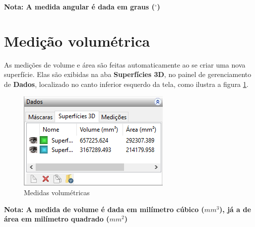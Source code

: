 \textbf{Nota: A medida angular é dada em graus ($^{\circ}$)}


\section{Medição volumétrica}

As medições de volume e área são feitas automaticamente ao se criar uma nova superfície.
Elas são exibidas na aba \textbf{Superfícies 3D}, no painel de gerenciamento de \textbf{Dados}, localizado no canto
inferior esquerdo da tela, como ilustra a figura \ref{fig:volumetric_mensure}.

\begin{figure}[!htb]
\centering
\includegraphics[scale=0.7]{../user_guide_figures/invesalius_screen/painel_volumetric_measures_pt.png}
\caption{Medidas volumétricas}
\label{fig:volumetric_mensure}
\end{figure}

\textbf{Nota: A medida de volume é dada em milímetro cúbico ($mm^3$), já a de área em milímetro quadrado ($mm^2$)}
